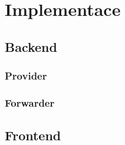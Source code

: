 \chapter{Implementace}
\section{Backend}
\subsection{Provider}
\subsection{Forwarder}
\section{Frontend}

